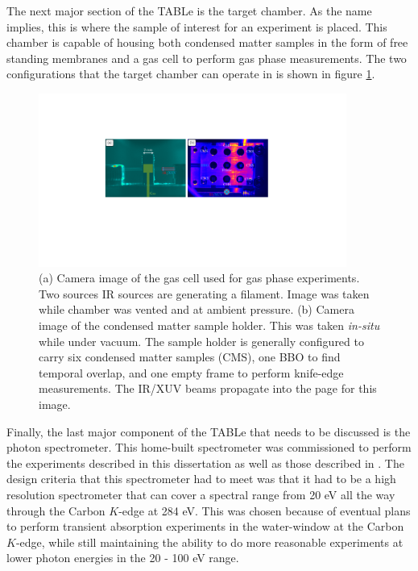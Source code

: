 The next major section of the TABLe is the target chamber.  As the name implies, this is where the sample of interest for an experiment is placed.  This chamber is capable of housing both condensed matter samples in the form of free standing membranes and a gas cell to perform gas phase measurements.  The two configurations that the target chamber can operate in is shown in figure \ref{fig:gas_solid_sample_holder}. 
\begin{figure}
	\centering
	\includegraphics[width=0.9\textwidth]{figures/Beamline/gas_solid_sample_holder.pdf}
	\caption[Camera image of target gas cell and condensed matter sample holder]{(a) Camera image of the gas cell used for gas phase experiments. Two sources IR sources are generating a filament. Image was taken while chamber was vented and at ambient pressure. (b) Camera image of the condensed matter sample holder.  This was taken \textit{in-situ} while under vacuum.  The sample holder is generally configured to carry six condensed matter samples (CMS), one BBO to find temporal overlap, and one empty frame to perform knife-edge measurements.  The IR/XUV beams propagate into the page for this image.}
	\label{fig:gas_solid_sample_holder}
\end{figure}

Finally, the last major component of the TABLe that needs to be discussed is the photon spectrometer.  This home-built spectrometer was commissioned to perform the experiments described in this dissertation as well as those described in \cite{smithApplicationAttosecondTechniques2020}.  The design criteria that this spectrometer had to meet was that it had to be a high resolution spectrometer that can cover a spectral range from 20 eV all the way through the Carbon $K$-edge at 284 eV.  This was chosen because of eventual plans to perform transient absorption experiments in the water-window at the Carbon $K$-edge, while still maintaining the ability to do more reasonable experiments at lower photon energies in the 20 - 100 eV range.

